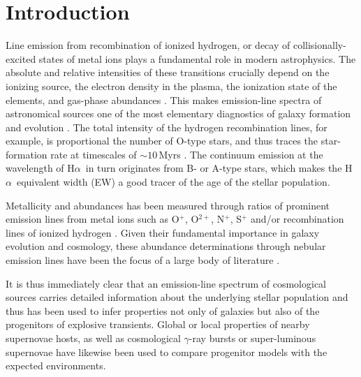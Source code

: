 \documentclass[traditabstract]{aa}
\newcommand{\ha}{H$\alpha$}
\begin{document}
\section{Introduction}
\label{sec:Intro}

Line emission from recombination of ionized hydrogen, or decay of collisionally-excited states of metal ions plays a fundamental role in modern astrophysics. The absolute and relative intensities of these transitions crucially depend on the ionizing source, the electron density in the plasma, the ionization state of the elements, and gas-phase abundances \citep{1989agna.book.....O}. This makes emission-line spectra of astronomical sources one of the most elementary diagnostics of galaxy formation and evolution \citep[e.g.][]{2004ApJ...613..898T, 2006ApJ...644..813E, 2009ApJ...706.1364F}. The total intensity of the hydrogen recombination lines, for example, is proportional the number of O-type stars, and thus traces the star-formation rate at timescales of $\sim 10$\,Myrs \citep[e.g.][]{1998ARA&A..36..189K}. The continuum emission at the wavelength of \ha\, in turn originates from B- or A-type stars, which makes the \ha\, equivalent width (EW) a good tracer of the age of the stellar population.

Metallicity and abundances has been measured through ratios of prominent emission lines from metal ions such as O$^{+}$, O$^{2+}$, N$^{+}$, S$^{+}$ and/or recombination lines of ionized hydrogen \citep{1979MNRAS.189...95P, 1979A&A....78..200A}. Given their fundamental importance in galaxy evolution and cosmology, these abundance determinations through nebular emission lines have been the focus of a large body of literature \citep[e.g.][]{2004ApJ...617..240K, 2005ApJ...631..231P, 2006A&A...454L.127S, 2006A&A...448..955I, 2008ApJ...681.1183K}.

It is thus immediately clear that an emission-line spectrum of cosmological sources carries detailed information about the underlying stellar population and thus has been used to infer properties not only of galaxies but also of the progenitors of explosive transients. Global \citep[e.g.][]{2008ApJ...673..999P, 2011MNRAS.412.1441L} or local \citep[e.g.][]{2010MNRAS.407.2660A, 2011ApJ...731L...4M, 2011A&A...530A..95L} properties of nearby supernovae hosts, as well as cosmological $\gamma$-ray bursts \citep[e.g.][]{2007A&A...464..529W, 2012A&A...546A...8K, 2013ApJ...774..119G} or super-luminous supernovae \citep[e.g.][]{2013ApJ...763L..28C, 2014ApJ...787..138L, 2014arXiv1409.8331L, 2016arXiv160408207P} have likewise been used to compare progenitor models with the expected environments. 
\end{document}
